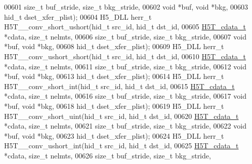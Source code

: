 \begin{DoxyCode}
00601                      \textcolor{keywordtype}{size\_t} buf\_stride, \textcolor{keywordtype}{size\_t} bkg\_stride,
00602                                      \textcolor{keywordtype}{void} *buf, \textcolor{keywordtype}{void} *bkg,
00603                                      hid\_t dset\_xfer\_plist);
00604 H5\_DLL herr\_t H5T\_\_conv\_short\_ushort(hid\_t src\_id, hid\_t dst\_id,
00605                      \hyperlink{struct_h5_t__cdata__t}{H5T\_cdata\_t} *cdata, \textcolor{keywordtype}{size\_t} nelmts,
00606                      \textcolor{keywordtype}{size\_t} buf\_stride, \textcolor{keywordtype}{size\_t} bkg\_stride,
00607                                      \textcolor{keywordtype}{void} *buf, \textcolor{keywordtype}{void} *bkg,
00608                                      hid\_t dset\_xfer\_plist);
00609 H5\_DLL herr\_t H5T\_\_conv\_ushort\_short(hid\_t src\_id, hid\_t dst\_id,
00610                      \hyperlink{struct_h5_t__cdata__t}{H5T\_cdata\_t} *cdata, \textcolor{keywordtype}{size\_t} nelmts,
00611                      \textcolor{keywordtype}{size\_t} buf\_stride, \textcolor{keywordtype}{size\_t} bkg\_stride,
00612                                      \textcolor{keywordtype}{void} *buf, \textcolor{keywordtype}{void} *bkg,
00613                                      hid\_t dset\_xfer\_plist);
00614 H5\_DLL herr\_t H5T\_\_conv\_short\_int(hid\_t src\_id, hid\_t dst\_id,
00615                   \hyperlink{struct_h5_t__cdata__t}{H5T\_cdata\_t} *cdata, \textcolor{keywordtype}{size\_t} nelmts,
00616                   \textcolor{keywordtype}{size\_t} buf\_stride, \textcolor{keywordtype}{size\_t} bkg\_stride,
00617                                   \textcolor{keywordtype}{void} *buf, \textcolor{keywordtype}{void} *bkg,
00618                                   hid\_t dset\_xfer\_plist);
00619 H5\_DLL herr\_t H5T\_\_conv\_short\_uint(hid\_t src\_id, hid\_t dst\_id,
00620                    \hyperlink{struct_h5_t__cdata__t}{H5T\_cdata\_t} *cdata, \textcolor{keywordtype}{size\_t} nelmts,
00621                    \textcolor{keywordtype}{size\_t} buf\_stride, \textcolor{keywordtype}{size\_t} bkg\_stride,
00622                                    \textcolor{keywordtype}{void} *buf, \textcolor{keywordtype}{void} *bkg,
00623                                    hid\_t dset\_xfer\_plist);
00624 H5\_DLL herr\_t H5T\_\_conv\_ushort\_int(hid\_t src\_id, hid\_t dst\_id,
00625                    \hyperlink{struct_h5_t__cdata__t}{H5T\_cdata\_t} *cdata, \textcolor{keywordtype}{size\_t} nelmts,
00626                    \textcolor{keywordtype}{size\_t} buf\_stride, \textcolor{keywordtype}{size\_t} bkg\_stride,

\end{DoxyCode}
